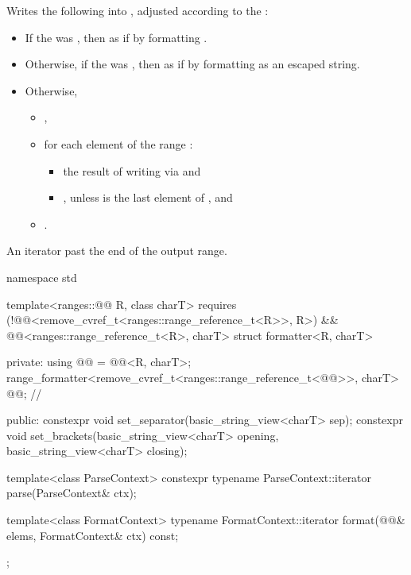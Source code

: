 \begin{itemdescr}
\pnum
\effects
Writes the following into ,
adjusted according to the :

\begin{itemize}
\item
If the  was ,
then as if by formatting .
\item
Otherwise, if the  was ,
then as if by formatting 
as an escaped string.
\item
Otherwise,
\begin{itemize}
\item
{},
\item
for each element  of the range :
\begin{itemize}
\item
the result of writing  via  and
\item
{}, unless  is the last element of , and
\end{itemize}
\item
{}.
\end{itemize}
\end{itemize}

\pnum
\returns
An iterator past the end of the output range.
\end{itemdescr}

%
\begin{codeblock}
namespace std {
  template<ranges::@@ R, class charT>
    requires (!@@<remove_cvref_t<ranges::range_reference_t<R>>, R>) &&
             @@<ranges::range_reference_t<R>, charT>
  struct formatter<R, charT> {
  private:
    using @@ = @@<R, charT>;
    range_formatter<remove_cvref_t<ranges::range_reference_t<@@>>,
                    charT> @@;       // \expos

  public:
    constexpr void set_separator(basic_string_view<charT> sep);
    constexpr void set_brackets(basic_string_view<charT> opening,
                                basic_string_view<charT> closing);

    template<class ParseContext>
      constexpr typename ParseContext::iterator
        parse(ParseContext& ctx);

    template<class FormatContext>
      typename FormatContext::iterator
        format(@@& elems, FormatContext& ctx) const;
  };
}
\end{codeblock}

